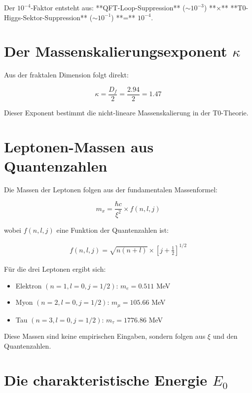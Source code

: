 \documentclass[12pt,a4paper]{article}
\theoremstyle{definition}
\begin{document}
Der $10^{-4}$-Faktor entsteht aus: **QFT-Loop-Suppression** ($\sim 10^{-3}$) **×** **T0-Higgs-Sektor-Suppression** ($\sim 10^{-1}$) **=** $10^{-4}$.
	\section{Der Massenskalierungsexponent $\kappa$}
	
	Aus der fraktalen Dimension folgt direkt:
	
	\begin{equation}
		\kappa = \frac{D_f}{2} = \frac{2.94}{2} = 1.47
	\end{equation}
	
	Dieser Exponent bestimmt die nicht-lineare Massenskalierung in der T0-Theorie.
	
	\section{Leptonen-Massen aus Quantenzahlen}
	
	Die Massen der Leptonen folgen aus der fundamentalen Massenformel:
	
	\begin{equation}
		m_x = \frac{\hbar c}{\xi^2} \times f(n, l, j)
	\end{equation}
	
	wobei $f(n, l, j)$ eine Funktion der Quantenzahlen ist:
	
	\begin{align}
		f(n, l, j) = \sqrt{n(n+l)} \times \left[j + \frac{1}{2}\right]^{1/2}
	\end{align}
	
	F\"ur die drei Leptonen ergibt sich:
	
	\begin{itemize}
		\item Elektron $(n=1, l=0, j=1/2)$: $m_e = 0.511$ MeV
		\item Myon $(n=2, l=0, j=1/2)$: $m_\mu = 105.66$ MeV
		\item Tau $(n=3, l=0, j=1/2)$: $m_\tau = 1776.86$ MeV
	\end{itemize}
	
	Diese Massen sind keine empirischen Eingaben, sondern folgen aus $\xi$ und den Quantenzahlen.
	
	\section{Die charakteristische Energie $E_0$}
	
\end{document}
